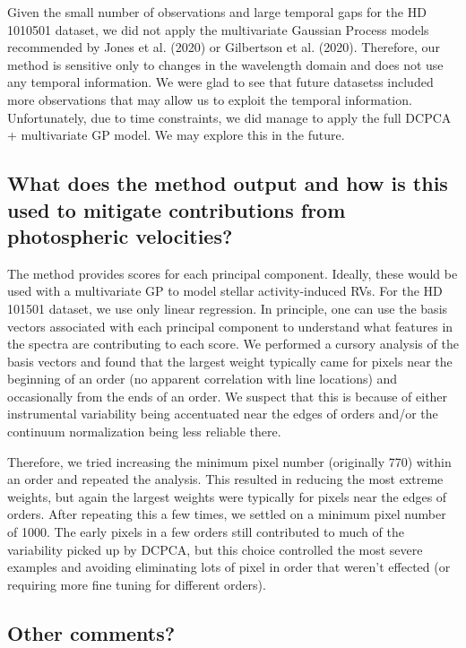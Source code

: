 \documentclass[12pt]{article}
\begin{document}
Given the small number of observations and large temporal gaps for the HD 1010501 dataset, we did not apply the multivariate Gaussian Process models recommended by Jones et al. (2020) or Gilbertson et al. (2020).
Therefore, our method is sensitive only to changes in the wavelength domain and does not use any temporal information.
We were glad to see that future datasetss included more observations that may allow us to exploit the temporal information.  Unfortunately, due to time constraints, we did manage to apply the full DCPCA + multivariate GP model.  We may explore this in the future.


\subsection{What does the method output and how is this used to mitigate contributions from photospheric velocities?}

The method provides scores for each principal component.  Ideally, these would be used with a multivariate GP to model stellar activity-induced RVs.  For the HD 101501 dataset, we use only linear regression.
In principle, one can use the basis vectors associated with each principal component to understand what features in the spectra are contributing to each score.
We performed a cursory analysis of the basis vectors and found that the largest weight typically came for pixels near the beginning of an order (no apparent correlation with line locations) and occasionally from the ends of an order.  We suspect that this is because of either instrumental variability being accentuated near the edges of orders and/or the continuum normalization being less reliable there.

Therefore, we tried increasing the minimum pixel number (originally 770) within an order and repeated the analysis.  This resulted in reducing the most extreme weights, but again the largest weights were typically for pixels near the edges of orders.  After repeating this a few times, we settled on a minimum pixel number of 1000.  The early pixels in a few orders still contributed to much of the variability picked up by DCPCA, but this choice controlled the most severe examples and avoiding eliminating lots of pixel in order that weren't effected (or requiring more fine tuning for different orders).

\subsection{Other comments?}
\end{document}
